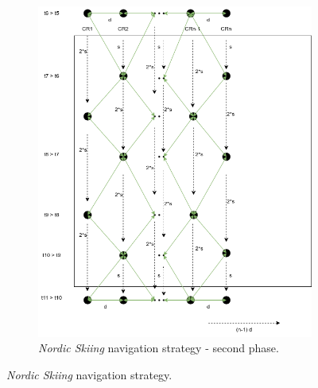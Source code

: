 \documentclass[english,RandD]{rapportPFE}  %
\begin{document}
\begin{figure}[h!]
\begin{subfigure}[t]{0.45\linewidth}
					\end{subfigure}
					\hfill
					\begin{subfigure}[t]{0.45\linewidth}
						\centering
						\includegraphics[width=\linewidth]{graphics/ski_nordique_2.png}
						\caption{\textit{Nordic Skiing} navigation strategy - second phase.}
						\label{fig:ski_nordique_2}
					\end{subfigure}
					\caption{\textit{Nordic Skiing} navigation strategy.}
					\label{fig:ski_nordique}
				\end{figure}
\end{document}

